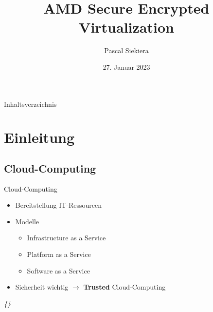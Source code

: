 \documentclass{sdqbeamer}
\title[AMD Secure Encrypted Virtualization]{AMD Secure Encrypted Virtualization}
\author[Pascal Siekiera]{Pascal Siekiera}
\date[27.\,01.\,2023]{27. Januar 2023}
\begin{document}
\KITtitleframe

\begin{frame}{Inhaltsverzeichnis}
\tableofcontents
\end{frame}


\section{Einleitung}

\subsection{Cloud-Computing}
\begin{frame}{Cloud-Computing}
	\begin{minipage}{0.6\linewidth}
		\begin{itemize}
			\item Bereitstellung IT-Ressourcen
			\item Modelle
			\begin{itemize}
				\item Infrastructure as a Service
				\item Platform as a Service
				\item Software as a Service
			\end{itemize}
			\item Sicherheit wichtig \(\rightarrow\) \textbf{Trusted} Cloud-Computing
		\end{itemize}


		\vspace{3ex}
		\vfill
		\small\textit{\{\cite{bechtold, ibm, weis}\}}
		

\end{minipage}
\end{frame}
\end{document}
